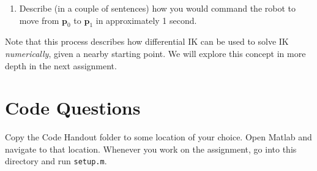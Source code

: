 \documentclass{16384_doc} %
\begin{document}
\begin{questions}
\begin{enumerate} [label=\alph*.]
        \item \text{[2 points]} Describe (in a couple of sentences) how you would command the
      robot to move from $\mathbf{p}_0$ to $\mathbf{p}_1$ in approximately 1
      second.
      \begin{tcolorbox}[height=3cm]
        \end{tcolorbox}
        
    \end{enumerate}

    Note that this process describes how differential IK can be used to solve
    IK \emph{numerically}, given a nearby starting point.  We will explore this
    concept in more depth in the next assignment.

\end{questions}


\section{Code Questions}
  
Copy the Code Handout folder to some location of your choice. Open Matlab and navigate to that location. Whenever you work on the assignment, go into this directory and run \verb!setup.m!. 
\end{document}

